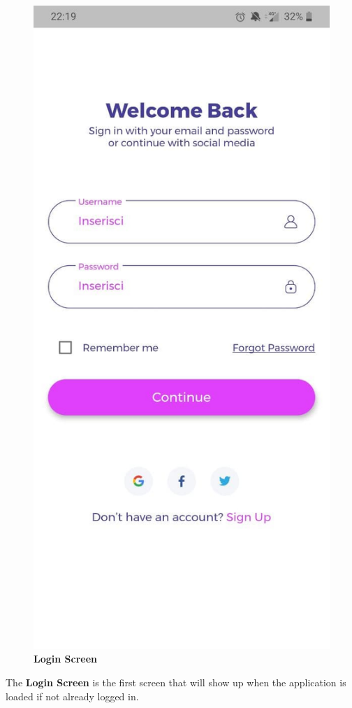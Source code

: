\documentclass[../../dd.tex]{subfiles}
\begin{document}
    \begin{figure}[H]
        \centering
        \includegraphics[height=.6\textheight]{../../assets/screens/login.jpg}
        \caption{\textbf{Login Screen}}\label{fig:figure}
    \end{figure}
    \begin{center}
        The \textbf{Login Screen} is the first screen that will show up when the application is loaded if not already logged in.
    \end{center}
\end{document}
